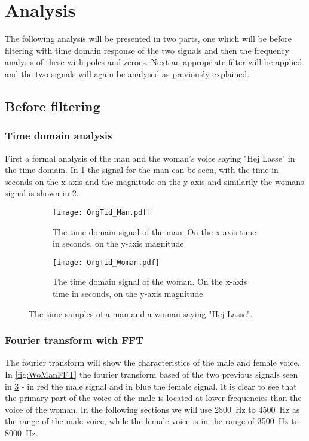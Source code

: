 
\section{Analysis}
\label{sec:analysis}
The following analysis will be presented in two parts, one which will be before filtering with time domain response of the two signals and then the frequency analysis of these with poles and zeroes. Next an appropriate filter will be applied and the two signals will again be analysed as previously explained.

\subsection{Before filtering}

\subsubsection{Time domain analysis}

First a formal analysis of the man and the woman's voice saying "Hej Lasse" in the time domain. In \cref{fig:time_man} the signal for the man can be seen, with the time in seconds on the x-axis and the magnitude on the y-axis and similarily the womans signal is shown in \cref{fig:time_woman}.

\begin{figure}[h]
	\centering
	\begin{subfigure}{0.45\textwidth}
		\texttt{[image: OrgTid\_Man.pdf]}
		\caption{The time domain signal of the man. On the x-axis time in seconds, on the y-axis magnitude}
		\label{fig:time_man}
	\end{subfigure}
	\quad
	\begin{subfigure}{0.45\textwidth}
		\texttt{[image: OrgTid\_Woman.pdf]}
		\caption{The time domain signal of the woman. On the x-axis time in seconds, on the y-axis magnitude}
		\label{fig:time_woman}
	\end{subfigure}
	\caption{The time samples of a man and a woman saying "Hej Lasse".}
	\label{fig:time_WoMan}
\end{figure}

\subsubsection{Fourier transform with FFT}

The fourier transform will show the characteristics of the male and female voice. In \cref{fig:WoManFFT} the fourier transform based of the two previous signals seen in \cref{fig:time_WoMan} - in red the male signal and in blue the female signal. It is clear to see that the primary part of the voice of the male is located at lower frequencies than the voice of the woman. In the following sections we will use \SI{2800}{\hertz} to \SI{4500}{\hertz} as the range of the male voice, while the female voice is in the range of \SI{3500}{\hertz} to \SI{8000}{\hertz}.

